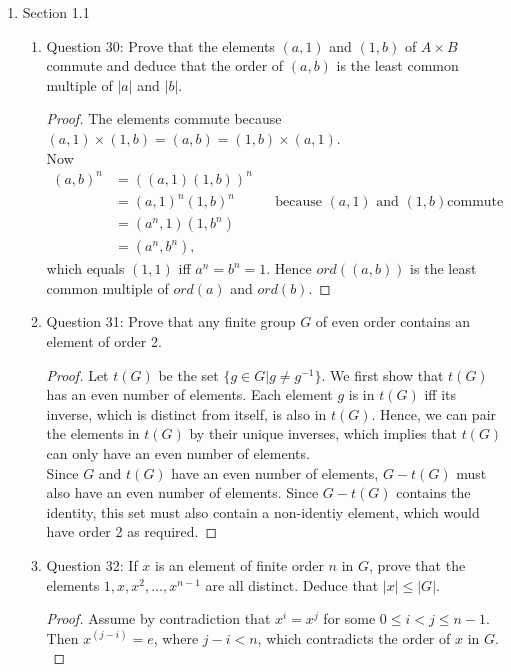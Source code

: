 \documentclass{article}
\begin{document}
\begin{enumerate}
  \item Section 1.1
    \begin{enumerate}
      \item Question 30: Prove that the elements $(a,1)$ and $(1,b)$ of
        $A\times B$ commute and deduce that the order of $(a,b)$ is the
        least common multiple of $|a|$ and $|b|$.
        \begin{proof}
          The elements commute because
          $(a,1)\times(1,b)=(a,b)=(1,b)\times(a,1)$. \\

          Now
          \begin{align*}
            (a,b)^n & = ((a,1)(1,b))^n && \\
                    & = (a,1)^n(1,b)^n && \text{because $(a,1)$ and $(1,b)$
                    commute} \\
                    & = (a^n,1)(1,b^n) && \\
                    & = (a^n,b^n),     &&
          \end{align*}
          which equals $(1,1)$ iff $a^n=b^n=1$. Hence $ord((a,b))$ is the
          least common multiple of $ord(a)$ and $ord(b)$.
        \end{proof}
      \item Question 31: Prove that any finite group $G$ of even order
        contains an element of order 2.
        \begin{proof}
          Let $t(G)$ be the set $\{g\in G | g \neq g^{-1}\}$. We first show
          that $t(G)$ has an even number of elements. Each element $g$ is
          in $t(G)$ iff its inverse, which is distinct from itself, is also
          in $t(G)$. Hence, we can pair the elements in $t(G)$ by their
          unique inverses, which implies that $t(G)$ can only have an even
          number of elements. \\

          Since $G$ and $t(G)$ have an even number of elements, $G-t(G)$
          must also have an even number of elements. Since $G-t(G)$
          contains the identity, this set must also contain a non-identiy
          element, which would have order 2 as required.
        \end{proof}
      \item Question 32: If $x$ is an element of finite order $n$ in $G$,
        prove that the elements $1,x,x^2,\ldots,x^{n-1}$ are all distinct.
        Deduce that $|x|\leq |G|$.
        \begin{proof}
          Assume by contradiction that $x^i=x^j$ for some $0\leq i<j \leq
          n-1$. Then $x^{(j-i)}=e$, where $j-i<n$, which contradicts the
          order of $x$ in $G$. \\


\end{proof}
\end{enumerate}
\end{enumerate}
\end{document}
